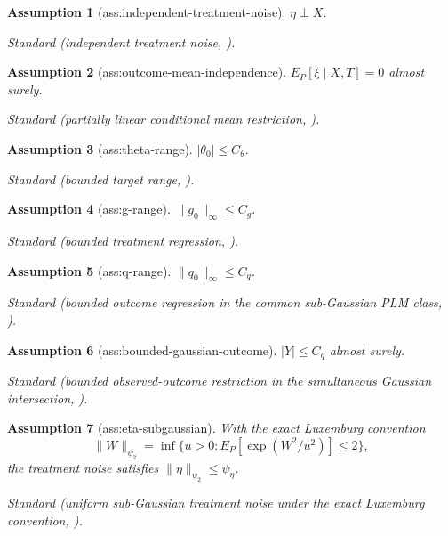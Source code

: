 \documentclass{article}
\newtheorem{assumption}{Assumption}
\begin{document}
\begin{assumption}[ass:independent-treatment-noise]\label{ass:independent-treatment-noise}
\(\eta\perp X\).
\par\smallskip\noindent\emph{Standard} (independent treatment noise, \cite{JinMackeySyrgkanis2025}).
\end{assumption}

\begin{assumption}[ass:outcome-mean-independence]\label{ass:outcome-mean-independence}
\(E_P[\xi\mid X,T]=0\) almost surely.
\par\smallskip\noindent\emph{Standard} (partially linear conditional mean restriction, \cite{Robinson1988}).
\end{assumption}

\begin{assumption}[ass:theta-range]\label{ass:theta-range}
\(|\theta_0|\le C_{\theta}\).
\par\smallskip\noindent\emph{Standard} (bounded target range, \cite{JinMackeySyrgkanis2025}).
\end{assumption}

\begin{assumption}[ass:g-range]\label{ass:g-range}
\(\|g_0\|_{\infty}\le C_g\).
\par\smallskip\noindent\emph{Standard} (bounded treatment regression, \cite{JinMackeySyrgkanis2025}).
\end{assumption}

\begin{assumption}[ass:q-range]\label{ass:q-range}
\(\|q_0\|_{\infty}\le C_q\).
\par\smallskip\noindent\emph{Standard} (bounded outcome regression in the common sub-Gaussian PLM class, \cite{JinMackeySyrgkanis2025}).
\end{assumption}

\begin{assumption}[ass:bounded-gaussian-outcome]\label{ass:bounded-gaussian-outcome}
\(|Y|\le C_q\) almost surely.
\par\smallskip\noindent\emph{Standard} (bounded observed-outcome restriction in the simultaneous Gaussian intersection, \cite{JinMackeySyrgkanis2025}).
\end{assumption}

\begin{assumption}[ass:eta-subgaussian]\label{ass:eta-subgaussian}
With the exact Luxemburg convention
\[
 \lVert W\rVert_{\psi_2}
 =\inf\{u>0:E_P[\exp(W^2/u^2)]\le2\},
\]
the treatment noise satisfies \(\lVert\eta\rVert_{\psi_2}\le\psi_{\eta}\).
\par\smallskip\noindent\emph{Standard} (uniform sub-Gaussian treatment noise under the exact Luxemburg convention, \cite{JinMackeySyrgkanis2025}).
\end{assumption}
\end{document}
